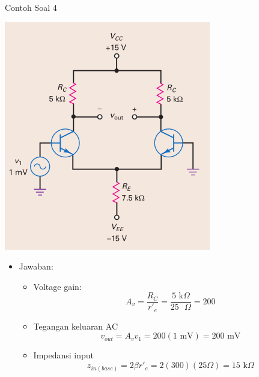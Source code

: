 \documentclass[aspectratio=169]{beamer}
\begin{document}
\begin{frame}{Contoh Soal 4}
	\begin{multicols}{2}
		\begin{center}
			\includegraphics[height=0.7\textheight]{gambar/01.diff-amp/01.contoh_soal_1-2}
		\end{center}
		\columnbreak
		\begin{itemize}
			\item Jawaban:
			\begin{itemize}
				\item Voltage gain:
				\[ A_v = \frac{R_C}{r'_e} = \frac{5 \text{ k}\Omega }{25 \text{ }\Omega } = 200 \]
				\item Tegangan keluaran AC
				\[ v_{out} = A_v v_1 = 200(1 \text{ mV}) = 200 \text{ mV} \]
				\item Impedansi input
				\[ z_{in(base)} = 2 \beta r'_e = 2(300)(25\Omega) = 15 \text{ k}\Omega\]
			\end{itemize}
		\end{itemize}
	\end{multicols}
\end{frame}
\end{document}
